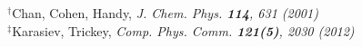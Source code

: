 \documentclass[mathserif, 8pt]{beamer}
\begin{document}
\begin{frame}
\begin{table}
\begin{center}
\begin{tabular}{ll|ll|llll}
	&		    &               &               &               &               &               &		    \\
\hline                                                                                  
\hline                                                                                  
\end{tabular}
\end{center}
\end{table}
\ \\
\ \\
\ \\
\ \\
\centering
$^\dag$\tiny{Chan, Cohen, Handy, \it{J. Chem. Phys.} \textbf{114}, 631 (2001)}\\
$^\ddag$\tiny{Karasiev, Trickey, \it{Comp. Phys. Comm.} \textbf{121(5)}, 2030 (2012)}
\end{frame}
\end{document}
